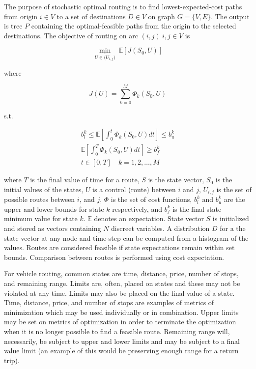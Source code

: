 The purpose of stochastic optimal routing is to find lowest-expected-cost paths from origin $i \in V$ to a set of destinations $D \in V$ on graph $G = \{V, E\}$. The output is tree $P$ containing the optimal-feasible paths from the origin to the selected destinations. The objective of routing on arc $(i,j)\ i, j \in V$ is

\begin{equation}
	\min_{U \in \overline({U}_{i,j})}\ \mathbb{E}[J(S_0, U)]
\end{equation}

where

\begin{equation}
	J(U) = \sum_{k = 0}^M \Phi_k(S_0, U)
\end{equation}

s.t.

\begin{gather}	
	b^k_l \leq \mathbb{E}\left[\int_0^t \Phi_k(S_0, U)dt\right] \leq b^k_u\\
	\mathbb{E}\left[\int_0^T \Phi_k(S_0, U)dt\right] \geq b^k_f\\
	t \in [0, T]\quad k = 1, 2, \dots, M
\end{gather}

\noindent where $T$ is the final value of time for a route, $S$ is the state vector, $S_0$ is the initial values of the states, $U$ is a control (route) between $i$ and $j$, $\overline{U}_{i,j}$ is the set of possible routes between $i$, and $j$, $\Phi$ is the set of cost functions, $b^k_l$ and $b^k_u$ are the upper and lower bounds for state $k$ respectively, and $b^k_f$ is the final state minimum value for state $k$. $\mathbb{E}$ denotes an expectation. State vector $S$ is initialized and stored as vectors containing $N$ discreet variables. A distribution $D$ for a the state vector at any node and time-step can be computed from a histogram of the values. Routes are considered feasible if state expectations remain within set bounds. Comparison between routes is performed using cost expectation.

For vehicle routing, common states are time, distance, price, number of stops, and remaining range. Limits are, often, placed on states and these may not be violated at any time. Limits may also be placed on the final value of a state. Time, distance, price, and number of stops are examples of metrics of minimization which may be used individually or in combination. Upper limits may be set on metrics of optimization in order to terminate the optimization when it is no longer possible to find a feasible route. Remaining range will, necessarily, be subject to upper and lower limits and may be subject to a final value limit (an example of this would be preserving enough range for a return trip).

